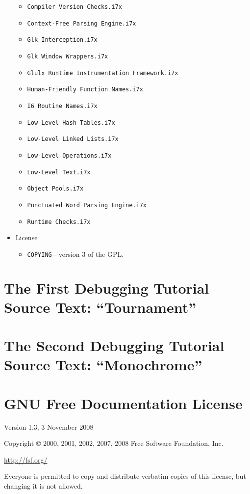 \documentclass{book}
\begin{document}
\begin{itemize}
\begin{itemize}
    \item{\texttt{Compiler Version Checks.i7x}}
    \item{\texttt{Context-Free Parsing Engine.i7x}}
    \item{\texttt{Glk Interception.i7x}}
    \item{\texttt{Glk Window Wrappers.i7x}}
    \item{\texttt{Glulx Runtime Instrumentation Framework.i7x}}
    \item{\texttt{Human-Friendly Function Names.i7x}}
    \item{\texttt{I6 Routine Names.i7x}} 
    \item{\texttt{Low-Level Hash Tables.i7x}}
    \item{\texttt{Low-Level Linked Lists.i7x}}
    \item{\texttt{Low-Level Operations.i7x}}
    \item{\texttt{Low-Level Text.i7x}}
    \item{\texttt{Object Pools.i7x}}
    \item{\texttt{Punctuated Word Parsing Engine.i7x}}
    \item{\texttt{Runtime Checks.i7x}}
  \end{itemize}
  \item{License}
  \begin{itemize}
    \item{\texttt{COPYING}---version 3 of the GPL.}
  \end{itemize}
\end{itemize}

\chapter{The First Debugging Tutorial Source Text: ``Tournament''}
\label{tournament}



\chapter{The Second Debugging Tutorial Source Text: ``Monochrome''}
\label{monochrome}



\chapter{GNU Free Documentation License}

\begin{center}
  Version 1.3, 3 November 2008

  Copyright \copyright{} 2000, 2001, 2002, 2007, 2008  Free Software Foundation, Inc.
  
  \bigskip
  
  \url{http://fsf.org/}
  
  \bigskip
  
  Everyone is permitted to copy and distribute verbatim copies of this license,
  but changing it is not allowed.
\end{center}
\end{document}

